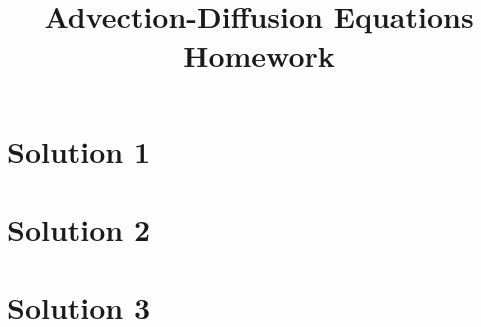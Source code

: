 \documentclass[aps,reprint, floatfix, footinbib]{revtex4}
\begin{document}
\title{Advection-Diffusion Equations Homework}

\maketitle

\section{Solution 1}


\section{Solution 2}

\section{Solution 3}
\end{document}
